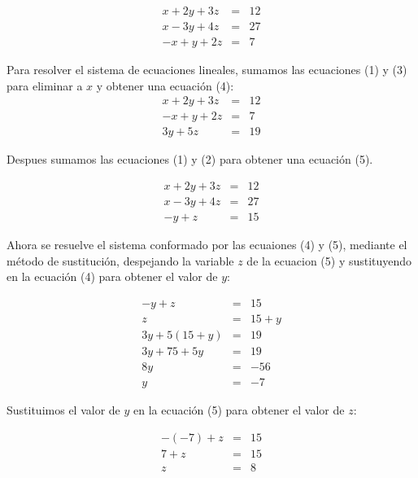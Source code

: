\documentclass[12pt,addpoints,answers]{repaso}
\begin{document}
\begin{questions}
{        \begin{eqnarray}
            x + 2y +3z  & = & 12 \\
            x - 3y +4z  & = & 27 \\
            -x +  y +2z & = & 7 
        \end{eqnarray}

        \begin{solutionbox}{18cm}
            Para resolver el sistema de ecuaciones lineales, sumamos las ecuaciones (1) y (3) para eliminar a $x$ y obtener una ecuación (4):
            \begin{eqnarray}
                x + 2y +3z  & = & 12 \nonumber\\
                -x +  y +2z & = & 7 \nonumber\\ \hline
                3y + 5z & = & 19 
            \end{eqnarray}

            Despues sumamos las ecuaciones (1) y (2) para obtener una ecuación (5).

            \begin{eqnarray}
                x + 2y +3z  & = & 12 \nonumber\\
                x - 3y +4z  & = & 27 \nonumber\\\hline
                -y + z & = & 15
            \end{eqnarray}

            Ahora se resuelve el sistema conformado por las ecuaiones (4) y (5), mediante el método de sustitución, despejando la variable $z$ de la ecuacion (5) y sustituyendo en la ecuación (4) para obtener el valor de $y$:

            \begin{eqnarray}
                -y + z & = & 15 \nonumber\\
               z & = & 15 + y \nonumber\\
                3y + 5(15 + y) & = & 19 \nonumber\\
                3y + 75 + 5y & = & 19 \nonumber\\
                8y & = & -56 \nonumber\\
                y & = & -7 \nonumber
            \end{eqnarray}

            Sustituimos el valor de $y$ en la ecuación (5) para obtener el valor de $z$:

            \begin{eqnarray}
                -(-7) + z & = & 15 \nonumber\\
                7 + z & = & 15 \nonumber\\
                z & = & 8 \nonumber
            \end{eqnarray}


\end{solutionbox}}
\end{questions}
\end{document}
